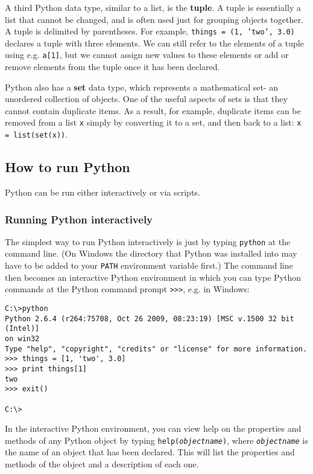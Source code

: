 A third Python data type, similar to a list, is the \textbf{tuple}.  A tuple is essentially a list that cannot be changed, and is often used just for grouping objects together.  A tuple is delimited by parentheses.  For example, \texttt{things = (1, 'two', 3.0)} declares a tuple with three elements.  We can still refer to the elements of a tuple using e.g. \texttt{a[1]}, but we cannot assign new values to these elements or add or remove elements from the tuple once it has been declared.

Python also has a \textbf{set} data type, which represents a mathematical set- an unordered collection of objects.  One of the useful aspects of sets is that they cannot contain duplicate items.  As a result, for example, duplicate items can be removed from a list \texttt{x} simply by converting it to a set, and then back to a list: \texttt{x = list(set(x))}.

\subsection{How to run Python}

Python can be run either interactively or via scripts.

\subsubsection{Running Python interactively}
\label{python_interactive}

The simplest way to run Python interactively is just by typing \texttt{python} at the command line.  (On Windows the directory that Python was installed into may have to be added to your \texttt{PATH} environment variable first.) The command line then becomes an interactive Python environment in which you can type Python commands at the Python command prompt \texttt{>>>}, e.g. in Windows:

\begin{verbatim}
C:\>python
Python 2.6.4 (r264:75708, Oct 26 2009, 08:23:19) [MSC v.1500 32 bit (Intel)]
on win32
Type "help", "copyright", "credits" or "license" for more information.
>>> things = [1, 'two', 3.0]
>>> print things[1]
two
>>> exit()

C:\>
\end{verbatim}

In the interactive Python environment, you can view help on the properties and methods of any Python object by typing \texttt{help(\emph{objectname})}, where \texttt{\emph{objectname}} is the name of an object that has been declared.  This will list the properties and methods of the object and a description of each one.

